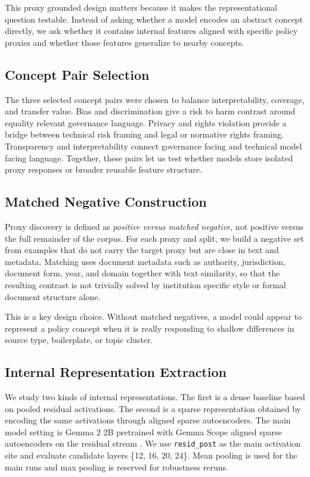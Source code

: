 ﻿\documentclass{article}
\begin{document}
This proxy grounded design matters because it makes the representational question testable. Instead of asking whether a model encodes an abstract concept directly, we ask whether it contains internal features aligned with specific policy proxies and whether those features generalize to nearby concepts.

\subsection{Concept Pair Selection}
The three selected concept pairs were chosen to balance interpretability, coverage, and transfer value. Bias and discrimination give a risk to harm contrast around equality relevant governance language. Privacy and rights violation provide a bridge between technical risk framing and legal or normative rights framing. Transparency and interpretability connect governance facing and technical model facing language. Together, these pairs let us test whether models store isolated proxy responses or broader reusable feature structure.

\subsection{Matched Negative Construction}
Proxy discovery is defined as \emph{positive versus matched negative}, not positive versus the full remainder of the corpus. For each proxy and split, we build a negative set from examples that do not carry the target proxy but are close in text and metadata. Matching uses document metadata such as authority, jurisdiction, document form, year, and domain together with text similarity, so that the resulting contrast is not trivially solved by institution specific style or formal document structure alone.

This is a key design choice. Without matched negatives, a model could appear to represent a policy concept when it is really responding to shallow differences in source type, boilerplate, or topic cluster.

\subsection{Internal Representation Extraction}
We study two kinds of internal representations. The first is a dense baseline based on pooled residual activations. The second is a sparse representation obtained by encoding the same activations through aligned sparse autoencoders. The main model setting is Gemma 2 2B pretrained with Gemma Scope aligned sparse autoencoders on the residual stream \citep{gemma2_2024, lieberum2024gemma}. We use \texttt{resid\_post} as the main activation site and evaluate candidate layers \{12, 16, 20, 24\}. Mean pooling is used for the main runs and max pooling is reserved for robustness reruns.
\end{document}
